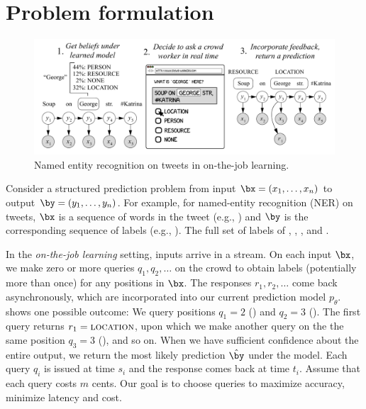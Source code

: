 \section{Problem formulation}
\label{sec:otj:problem}

\begin{figure}[t]
  \begin{centering}
  \includegraphics[width=1.0\textwidth]{figures/intro-banner.pdf}
  \end{centering}
  \caption{\label{fig:otj:crf}
    Named entity recognition on tweets in on-the-job learning.
}

\end{figure}

Consider a structured prediction problem from input $\bx = (x_1, \dots, x_n)$ to output $\by = (y_1, \dots, y_n)$.
For example, for named-entity recognition (NER) on tweets,
$\bx$ is a sequence of words in the tweet (e.g., )
and $\by$ is the corresponding sequence of labels (e.g., \scnone{} \scloc{} \scloc{}).
The full set of labels of \scper{}, \scloc{}, \scres{}, and \scnone{}.

In the \emph{on-the-job learning} setting, inputs arrive in a stream.
On each input $\bx$,
we make zero or more queries $q_1, q_2, \dots$ on the crowd to obtain labels
(potentially more than once)
for any positions in $\bx$.
The responses $r_1, r_2, \dots$ come back asynchronously,
which are incorporated into our current prediction model $p_\theta$.
 shows one possible outcome:
We query positions $q_1 = 2$ () and $q_2=3$ ().
The first query returns $r_1 = \textsc{location}$,
upon which we make another query on the the same position $q_3 = 3$ (),
and so on.
When we have sufficient confidence about the entire output,
we return the most likely prediction $\hat \by$ under the model.
Each query $q_i$ is issued at time $s_i$ and the response comes back at time $t_i$.
Assume that each query costs $m$ cents.
Our goal is to choose queries to maximize accuracy, minimize latency and cost.

